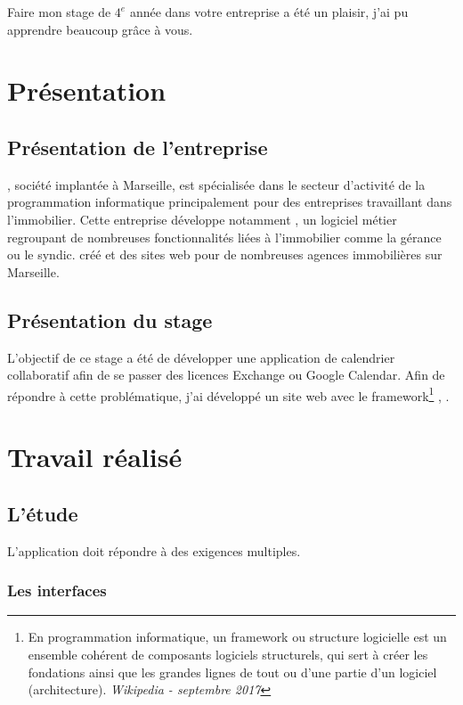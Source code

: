 \documentclass[a4paper, 11pt]{report}
\begin{document}
Faire mon stage de $4^e$ année dans votre entreprise a été un plaisir, j'ai pu apprendre beaucoup grâce à vous.

\tableofcontents

\chapter{Présentation}
\section{Présentation de l'entreprise}
\lgk\cite{logilink}, société implantée à Marseille, est spécialisée dans le secteur d'activité de la programmation informatique principalement pour des entreprises travaillant dans l'immobilier. Cette entreprise développe notamment \ulti, un logiciel métier regroupant de nombreuses fonctionnalités liées à l’immobilier comme la gérance ou le syndic. \lgk créé et des sites web pour de nombreuses agences immobilières sur Marseille.

\section{Présentation du stage}
L'objectif de ce stage a été de développer une application de calendrier collaboratif afin de se passer des licences Exchange\cite{ex} ou Google Calendar\cite{gcal}. Afin de répondre à cette problématique, j'ai développé un site web avec le framework\footnote{En programmation informatique, un framework ou structure logicielle est un ensemble cohérent de composants logiciels structurels, qui sert à créer les fondations ainsi que les grandes lignes de tout ou d'une partie d'un logiciel (architecture). \textit{Wikipedia - septembre 2017}} \php\cite{php}, \symfony\cite{symfony}.

\chapter{Travail réalisé}
\section{L'étude}
L'application doit répondre à des exigences multiples.
    \subsection{Les interfaces}
\end{document}
